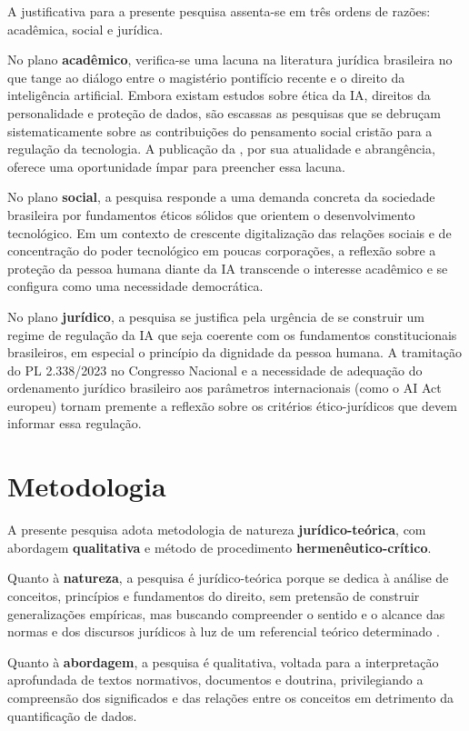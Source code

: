 A justificativa para a presente pesquisa assenta-se em três ordens de razões: acadêmica, social e jurídica.

No plano \textbf{acadêmico}, verifica-se uma lacuna na literatura jurídica brasileira no que tange ao diálogo entre o magistério pontifício recente e o direito da inteligência artificial. Embora existam estudos sobre ética da IA, direitos da personalidade e proteção de dados, são escassas as pesquisas que se debruçam sistematicamente sobre as contribuições do pensamento social cristão para a regulação da tecnologia. A publicação da \MH{}, por sua atualidade e abrangência, oferece uma oportunidade ímpar para preencher essa lacuna.

No plano \textbf{social}, a pesquisa responde a uma demanda concreta da sociedade brasileira por fundamentos éticos sólidos que orientem o desenvolvimento tecnológico. Em um contexto de crescente digitalização das relações sociais e de concentração do poder tecnológico em poucas corporações, a reflexão sobre a proteção da pessoa humana diante da IA transcende o interesse acadêmico e se configura como uma necessidade democrática.

No plano \textbf{jurídico}, a pesquisa se justifica pela urgência de se construir um regime de regulação da IA que seja coerente com os fundamentos constitucionais brasileiros, em especial o princípio da dignidade da pessoa humana. A tramitação do PL 2.338/2023 no Congresso Nacional e a necessidade de adequação do ordenamento jurídico brasileiro aos parâmetros internacionais (como o AI Act europeu) tornam premente a reflexão sobre os critérios ético-jurídicos que devem informar essa regulação.

\section{Metodologia}
\label{sec:metodologia}

A presente pesquisa adota metodologia de natureza \textbf{jurídico-teórica}, com abordagem \textbf{qualitativa} e método de procedimento \textbf{hermenêutico-crítico}.

Quanto à \textbf{natureza}, a pesquisa é jurídico-teórica porque se dedica à análise de conceitos, princípios e fundamentos do direito, sem pretensão de construir generalizações empíricas, mas buscando compreender o sentido e o alcance das normas e dos discursos jurídicos à luz de um referencial teórico determinado \cite{Comparato2016DH}.

Quanto à \textbf{abordagem}, a pesquisa é qualitativa, voltada para a interpretação aprofundada de textos normativos, documentos e doutrina, privilegiando a compreensão dos significados e das relações entre os conceitos em detrimento da quantificação de dados.

